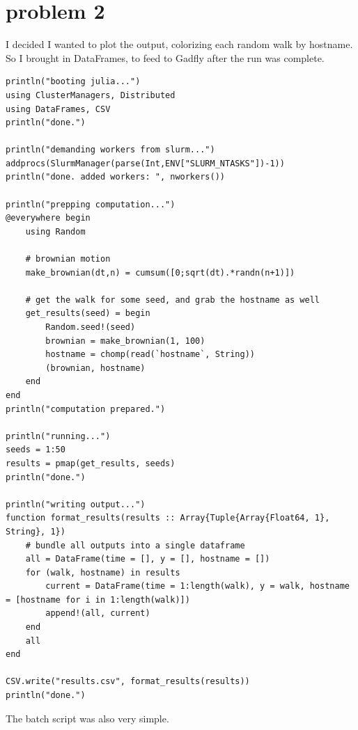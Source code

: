 \documentclass[nobib]{tufte-handout}
\begin{document}
\section{problem 2}
\label{sec:orgba0ba97}

I decided I wanted to plot the output, colorizing each random walk by hostname. So I brought in DataFrames, to feed to Gadfly after the run was complete.


\begin{verbatim}
println("booting julia...")
using ClusterManagers, Distributed
using DataFrames, CSV
println("done.")

println("demanding workers from slurm...")
addprocs(SlurmManager(parse(Int,ENV["SLURM_NTASKS"])-1))
println("done. added workers: ", nworkers())

println("prepping computation...")
@everywhere begin
    using Random

    # brownian motion
    make_brownian(dt,n) = cumsum([0;sqrt(dt).*randn(n+1)])

    # get the walk for some seed, and grab the hostname as well
    get_results(seed) = begin
        Random.seed!(seed)
        brownian = make_brownian(1, 100)
        hostname = chomp(read(`hostname`, String))
        (brownian, hostname)
    end
end
println("computation prepared.")

println("running...")
seeds = 1:50
results = pmap(get_results, seeds)
println("done.")

println("writing output...")
function format_results(results :: Array{Tuple{Array{Float64, 1}, String}, 1})
    # bundle all outputs into a single dataframe
    all = DataFrame(time = [], y = [], hostname = [])
    for (walk, hostname) in results
        current = DataFrame(time = 1:length(walk), y = walk, hostname = [hostname for i in 1:length(walk)])
        append!(all, current)
    end
    all
end

CSV.write("results.csv", format_results(results))
println("done.")

\end{verbatim}

The batch script was also very simple.
\end{document}
